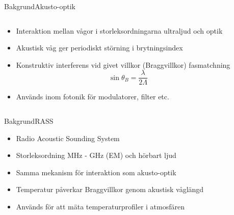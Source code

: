 \documentclass[11pt]{beamer}
\begin{document}
	\begin{frame}{Bakgrund}{Akusto-optik}
		\begin{columns}
			\begin{column}{0.6\textwidth}
				\begin{itemize}
					\item<1-> Interaktion mellan vågor i storleksordningarna ultraljud och optik
					\item<2-> Akustisk våg ger periodiskt störning i brytningsindex
					\item<3-> Konstruktiv interferens vid givet villkor (Braggvillkor) fasmatchning
					\begin{equation*}
						\sin{\theta_B} = \frac{\lambda}{2\Lambda}
					\end{equation*}
					\item<4-> Används inom fotonik för modulatorer, filter etc.
				\end{itemize}
			\end{column}
			\begin{column}{0.4\textwidth}
				\uncover<2->{
					\resizebox{\textwidth}{!}{
						
					}
				}
			\end{column}
		\end{columns}
	\end{frame}
	
	\begin{frame}{Bakgrund}{RASS}
		\begin{itemize}
			\item Radio Acoustic Sounding System
			\pause
			\item Storleksordning MHz - GHz (EM) och hörbart ljud
			\pause
			\item Samma mekanism för interaktion som akusto-optik
			\pause
			\item Temperatur påverkar Braggvillkor genom akustisk våglängd
			\pause
			\item Används för att mäta temperaturprofiler i atmosfären
		\end{itemize}
	\end{frame}
\end{document}
